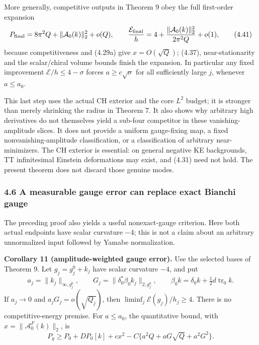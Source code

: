 \documentclass[
  11pt,
]{article}
\begin{document}
More generally, competitive outputs in Theorem 9 obey the full
first-order expansion \[
 P_{\rm final}=8\pi^2Q+\|\mathcal A_0(k)\|_2^2+o(Q),\qquad
 \frac{\mathcal E_{\rm final}}h
       =4+\frac{\|\mathcal A_0(k)\|_2^2}{2\pi^2Q}+o(1),
 \tag{4.41}
\] because competitiveness and (4.29a) give \(x=O(\sqrt Q)\); (4.37),
near-stationarity and the scalar/chiral volume bounds finish the
expansion. In particular any fixed improvement
\(\mathcal E/h\le4-\sigma\) forces \(a\ge c\sqrt{\sigma}\) for all
sufficiently large \(j\), whenever \(a\le a_0\).

This last step uses the actual CH exterior and the core \(L^2\) budget;
it is stronger than merely shrinking the radius in Theorem 7. It also
shows why arbitrary high derivatives do not themselves yield a sub-four
competitor in these vanishing-amplitude slices. It does not provide a
uniform gauge-fixing map, a fixed nonvanishing-amplitude classification,
or a classification of arbitrary near-minimizers. The CH exterior is
essential: on general negative KE backgrounds, TT infinitesimal Einstein
deformations may exist, and (4.31) need not hold. The present theorem
does not discard those genuine modes.

\hypertarget{a-measurable-gauge-error-can-replace-exact-bianchi-gauge}{%
\subsubsection{4.6 A measurable gauge error can replace exact Bianchi
gauge}\label{a-measurable-gauge-error-can-replace-exact-bianchi-gauge}}

The preceding proof also yields a useful nonexact-gauge criterion. Here
both actual endpoints have scalar curvature \(-4\); this is not a claim
about an arbitrary unnormalized input followed by Yamabe normalization.

\textbf{Corollary 11 (amplitude-weighted gauge error).} Use the selected
bases of Theorem 9. Let \(g_j=g_j^0+k_j\) have scalar curvature \(-4\),
and put \[
 a_j=\|k_j\|_{\infty,g_j^0},\qquad
 G_j=\|\delta_0^*\beta_0 k_j\|_{2,g_j^0},\qquad
 \beta_0k=\delta_0k+\tfrac12d\operatorname{tr}_0k.
\] If \(a_j\to0\) and \(a_jG_j=o(\sqrt{Q_j})\), then
\(\liminf_j\mathcal E(g_j)/h_j\ge4\). There is no competitive-energy
premise. For \(a\le a_0\), the quantitative bound, with
\(x=\|\mathcal A_0^F(k)\|_2\), is \[
 \boxed{P_g\ge P_0+DP_0[k]+c x^2
             -C\{a^2Q+aG\sqrt Q+a^2G^2\}.} \tag{4.42}
\]
\end{document}
